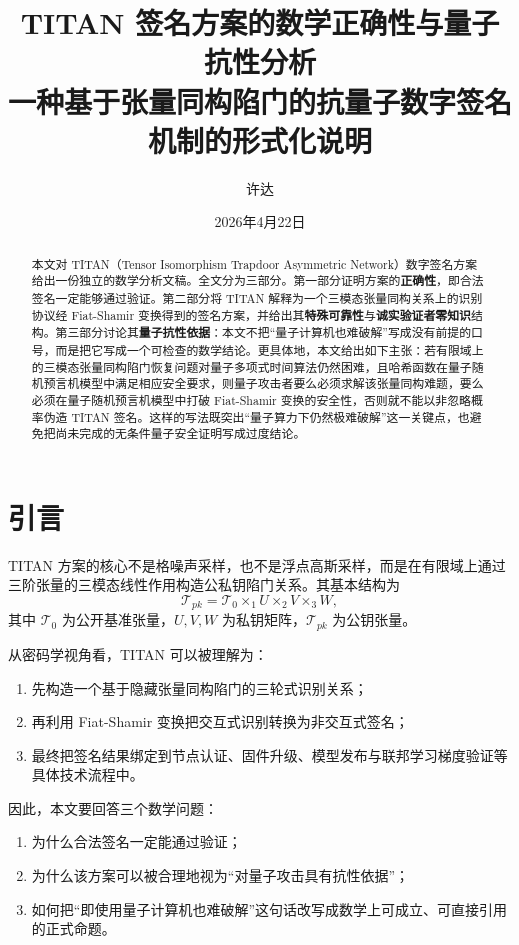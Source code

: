 \documentclass[12pt,a4paper]{article}
\title{\textbf{TITAN 签名方案的数学正确性与量子抗性分析} \\
\large 一种基于张量同构陷门的抗量子数字签名机制的形式化说明}
\author{许达}
\date{2026年4月22日}
\theoremstyle{remark}
\begin{document}
\maketitle

\begin{abstract}
本文对 TITAN（Tensor Isomorphism Trapdoor Asymmetric Network）数字签名方案给出一份独立的数学分析文稿。全文分为三部分。第一部分证明方案的\textbf{正确性}，即合法签名一定能够通过验证。第二部分将 TITAN 解释为一个三模态张量同构关系上的识别协议经 Fiat-Shamir 变换得到的签名方案，并给出其\textbf{特殊可靠性}与\textbf{诚实验证者零知识}结构。第三部分讨论其\textbf{量子抗性依据}：本文不把“量子计算机也难破解”写成没有前提的口号，而是把它写成一个可检查的数学结论。更具体地，本文给出如下主张：若有限域上的三模态张量同构陷门恢复问题对量子多项式时间算法仍然困难，且哈希函数在量子随机预言机模型中满足相应安全要求，则量子攻击者要么必须求解该张量同构难题，要么必须在量子随机预言机模型中打破 Fiat-Shamir 变换的安全性，否则就不能以非忽略概率伪造 TITAN 签名。这样的写法既突出“量子算力下仍然极难破解”这一关键点，也避免把尚未完成的无条件量子安全证明写成过度结论。
\end{abstract}

\section{引言}

TITAN 方案的核心不是格噪声采样，也不是浮点高斯采样，而是在有限域上通过三阶张量的三模态线性作用构造公私钥陷门关系。其基本结构为
\[
\mathcal{T}_{pk}=\mathcal{T}_0 \times_1 U \times_2 V \times_3 W,
\]
其中 $\mathcal{T}_0$ 为公开基准张量，$U,V,W$ 为私钥矩阵，$\mathcal{T}_{pk}$ 为公钥张量。

从密码学视角看，TITAN 可以被理解为：
\begin{enumerate}
    \item 先构造一个基于隐藏张量同构陷门的三轮式识别关系；
    \item 再利用 Fiat-Shamir 变换把交互式识别转换为非交互式签名；
    \item 最终把签名结果绑定到节点认证、固件升级、模型发布与联邦学习梯度验证等具体技术流程中。
\end{enumerate}

因此，本文要回答三个数学问题：
\begin{enumerate}
    \item 为什么合法签名一定能通过验证；
    \item 为什么该方案可以被合理地视为“对量子攻击具有抗性依据”；
    \item 如何把“即使用量子计算机也难破解”这句话改写成数学上可成立、可直接引用的正式命题。
\end{enumerate}
\end{document}
